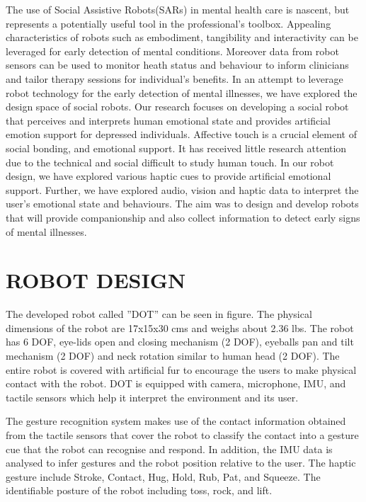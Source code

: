 \documentclass[letterpaper, 10 pt, conference]{ieeeconf}  %
\begin{document}
The use of Social Assistive Robots(SARs) in mental health care is nascent, but represents a potentially useful tool in the professional's toolbox. Appealing characteristics of robots such as embodiment, tangibility and interactivity can be leveraged for early detection of mental conditions. Moreover data from robot sensors can be used to monitor heath status and behaviour to inform clinicians and tailor therapy sessions for individual's benefits. In an attempt to leverage robot technology for the early detection of mental illnesses, we have explored the design space of social robots. Our research focuses on developing a social robot that perceives and interprets human emotional state and provides artificial emotion support for depressed individuals. Affective touch is a crucial element of social bonding, and emotional support. It has received little research attention due to the technical and social difficult to study human touch. In our robot design, we have explored various haptic cues to provide artificial emotional support. Further, we have explored audio, vision and haptic data to interpret the user's emotional state and behaviours. The aim was to design and develop robots that will provide companionship and also collect information to detect early signs of mental illnesses. 

\section{ROBOT DESIGN}

The developed robot called ''DOT'' can be seen in figure. The physical dimensions of the robot are 17x15x30 cms and weighs about 2.36 lbs. The robot has 6 DOF, eye-lids open and closing mechanism (2 DOF), eyeballs pan and tilt mechanism (2 DOF) and neck rotation similar to human head (2 DOF). The entire robot is covered with artificial fur to encourage the users to make physical contact with the robot. DOT is equipped with camera, microphone, IMU, and tactile sensors which help it interpret the environment and its user.  

The gesture recognition system makes use of the contact information obtained from the tactile sensors that cover the robot to classify the contact into a gesture cue that the robot can recognise and respond. In addition, the IMU data is analysed to infer gestures and the robot position relative to the user. The haptic gesture include Stroke, Contact, Hug, Hold, Rub, Pat, and Squeeze. The identifiable posture of the robot including toss, rock, and lift.  
\end{document}
